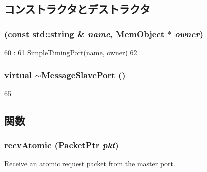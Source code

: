 \subsection{コンストラクタとデストラクタ}
\hypertarget{classMessageSlavePort_a685648e7373952f0d35b2570275649cd}{
\subsubsection[{MessageSlavePort}]{ (const std::string \& {\em name}, \/  {\bf MemObject} $\ast$ {\em owner})}}
\label{classMessageSlavePort_a685648e7373952f0d35b2570275649cd}



\begin{DoxyCode}
60                                                               :
61         SimpleTimingPort(name, owner)
62     {}

\end{DoxyCode}
\hypertarget{classMessageSlavePort_ac49d794fcd3b28b1e40ec26c996ae8fc}{
\subsubsection[{$\sim$MessageSlavePort}]{\setlength{\rightskip}{0pt plus 5cm}virtual $\sim${\bf MessageSlavePort} ()}}
\label{classMessageSlavePort_ac49d794fcd3b28b1e40ec26c996ae8fc}



\begin{DoxyCode}
65     {}
\end{DoxyCode}


\subsection{関数}
\hypertarget{classMessageSlavePort_a5f0b4c4a94f6b0053f9d7a4eb9c2518a}{
\subsubsection[{recvAtomic}]{ recvAtomic ({\bf PacketPtr} {\em pkt})}}
\label{classMessageSlavePort_a5f0b4c4a94f6b0053f9d7a4eb9c2518a}
Receive an atomic request packet from the master port. 

